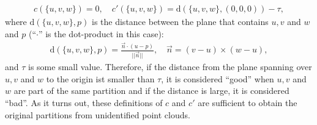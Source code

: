 \begin{align*}
    c(\{u,v,w\}) = 0,\quad c'(\{u,v,w\}) = \mathrm{d}(\{ u,v,w \},(0,0,0)) - \tau,
\end{align*}
where $\mathrm{d}(\{u,v,w\},p)$ is the distance between the plane that contains $u,v$ and $w$ and $p$ (``$\cdot$'' is the dot-product in this case):
\begin{align*}
    \mathrm{d}(\{u,v,w\},p) = \frac{\vec{n} \cdot (u - p)}{||\vec{n}||},\quad \vec{n} = (v-u)\times (w-u),
\end{align*}
and $\tau$ is some small value. Therefore, if the distance from the plane spanning over $u,v$ and $w$ to the origin ist smaller than $\tau$, it is considered ``good'' when $u,v$ and $w$ are part of the same partition and if the distance is large, it is considered ``bad''. As it turns out, these definitions of $c$ and $c'$ are sufficient to obtain the original partitions from unidentified point clouds.

